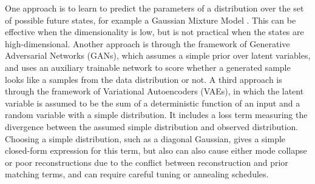 \documentclass{article}
\begin{document}
One approach is to learn to predict the parameters of a distribution over the set of possible future states, for example a Gaussian Mixture Model \citep{mixture-density-networks}.
This can be effective when the dimensionality is low, but is not practical when the states are high-dimensional.
Another approach is through the framework of Generative Adversarial Networks \citep{GAN} (GANs), which assumes a simple prior over latent variables, and uses an auxiliary trainable network to score whether a generated sample looks like a samples from the data distribution or not.
A third approach is through the framework of Variational Autoencoders \citep{VAE} (VAEs), in which the latent variable is assumed to be the sum of a deterministic function of an input and a random variable with a simple distribution.
It includes a loss term measuring the divergence between the assumed simple distribution and observed distribution.
Choosing a simple distribution, such as a diagonal Gaussian, gives a simple closed-form expression for this term, but also can also cause either mode collapse or poor reconstructions due to the conflict between reconstruction and prior matching terms, and can require careful tuning or annealing schedules.
\end{document}
